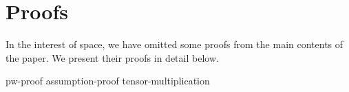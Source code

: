 \section{Proofs}
\label{app:proofs}

In the interest of space, we have omitted some proofs from
the main contents of the paper. 
We present their proofs in detail below.

{pw-proof}
{assumption-proof}
{tensor-multiplication}

